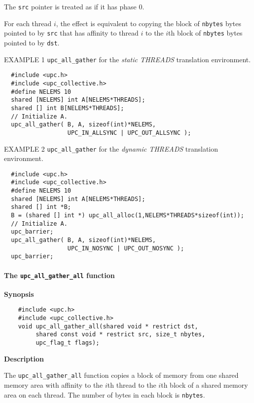 \np The {\tt src} pointer is treated as if it has phase 0.

\np For each thread $i$, the effect is equivalent to copying
the block of {\tt nbytes} bytes
pointed to by {\tt src} that has affinity to thread $i$
to the $i$th block of {\tt nbytes} bytes pointed to by {\tt dst}.

\np EXAMPLE 1 {\tt upc\_all\_gather} for the {\em static THREADS}
translation environment.

\begin{verbatim}
  #include <upc.h>
  #include <upc_collective.h>
  #define NELEMS 10
  shared [NELEMS] int A[NELEMS*THREADS];
  shared [] int B[NELEMS*THREADS];
  // Initialize A.
  upc_all_gather( B, A, sizeof(int)*NELEMS,
                  UPC_IN_ALLSYNC | UPC_OUT_ALLSYNC );
\end{verbatim}

\np EXAMPLE 2 {\tt upc\_all\_gather} for the {\em dynamic THREADS}
translation environment.

\begin{verbatim}
  #include <upc.h>
  #include <upc_collective.h>
  #define NELEMS 10
  shared [NELEMS] int A[NELEMS*THREADS];
  shared [] int *B;
  B = (shared [] int *) upc_all_alloc(1,NELEMS*THREADS*sizeof(int));
  // Initialize A.
  upc_barrier;
  upc_all_gather( B, A, sizeof(int)*NELEMS,
                  UPC_IN_NOSYNC | UPC_OUT_NOSYNC );
  upc_barrier;
\end{verbatim}

\paragraph{The {\tt upc\_all\_gather\_all} function}

{\bf Synopsis} 

\npf\vspace{-2.5em} 
\begin{verbatim}
    #include <upc.h>
    #include <upc_collective.h>
    void upc_all_gather_all(shared void * restrict dst,
         shared const void * restrict src, size_t nbytes,
         upc_flag_t flags);
\end{verbatim}

{\bf Description} 

\np
The {\tt upc\_all\_gather\_all} function copies a block of memory from one
shared memory area with affinity to the $i$th thread to the $i$th block
of a shared memory area on each thread.
The number of bytes in each block is {\tt nbytes}.

